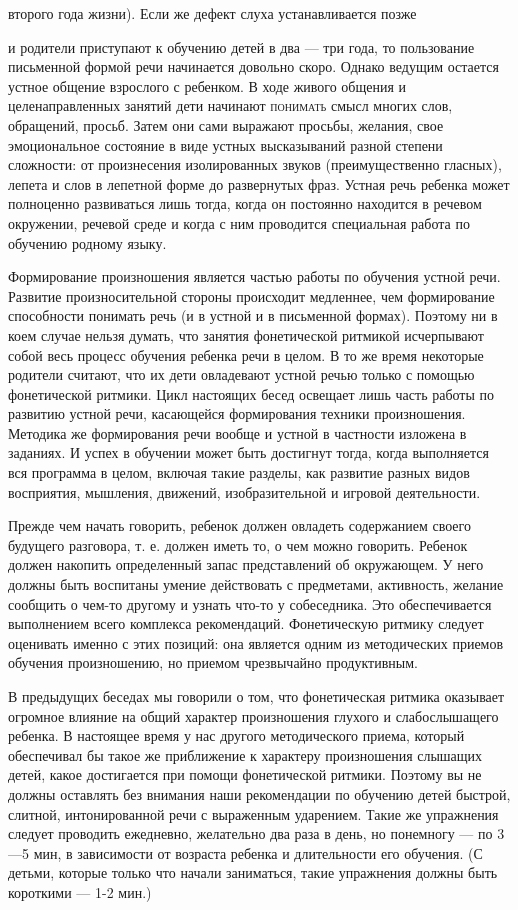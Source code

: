 \documentclass[a5paper]{book}
\begin{document}
второго года жизни). Если же дефект слуха устанавливается позже

и родители приступают к обучению детей в два --- три года, то
пользование письменной формой речи начинается довольно скоро. Однако
ведущим остается устное общение взрослого с ребенком. В ходе живого
общения и целенаправленных занятий дети начинают \textsc{понимать} смысл
многих слов, обращений, просьб. Затем они сами выражают просьбы,
желания, свое эмоциональное состояние в виде устных высказываний разной
степени сложности: от произнесения изолированных звуков (преимущественно
гласных), лепета и слов в лепетной форме до развернутых фраз. Устная
речь ребенка может полноценно развиваться лишь тогда, когда он постоянно
находится в речевом окружении, речевой среде и когда с ним проводится
специальная работа по обучению родному языку.

Формирование произношения является частью работы по обучения устной
речи. Развитие произносительной стороны происходит медленнее, чем
формирование способности понимать речь (и в устной и в письменной
формах). Поэтому ни в коем случае нельзя думать, что занятия
фонетической ритмикой исчерпывают собой весь процесс обучения ребенка
речи в целом. В то же время некоторые родители считают, что их дети
овладевают устной речью только с помощью фонетической ритмики. Цикл
настоящих бесед освещает лишь часть работы по развитию устной речи,
касающейся формирования техники произношения. Методика же формирования
речи вообще и устной в частности изложена в заданиях. И успех в обучении
может быть достигнут тогда, когда выполняется вся программа в целом,
включая такие разделы, как развитие разных видов восприятия, мышления,
движений, изобразительной и игровой деятельности.

Прежде чем начать говорить, ребенок должен овладеть содержанием своего
будущего разговора, т. е. должен иметь то, о чем можно говорить. Ребенок
должен накопить определенный запас представлений об окружающем. У него
должны быть воспитаны умение действовать с предметами, активность,
желание сообщить о чем-то другому и узнать что-то у собеседника. Это
обеспечивается выполнением всего комплекса рекомендаций. Фонетическую
ритмику следует оценивать именно с этих позиций: она является одним из
методических приемов обучения произношению, но приемом чрезвычайно
продуктивным.

В предыдущих беседах мы говорили о том, что фонетическая ритмика
оказывает огромное влияние на общий характер произношения глухого и
слабослышащего ребенка. В настоящее время у нас другого методического
приема, который обеспечивал бы такое же приближение к характеру
произношения слышащих детей, какое достигается при помощи фонетической
ритмики. Поэтому вы не должны оставлять без внимания наши рекомендации
по обучению детей быстрой, слитной, интонированной речи с выраженным
ударением. Такие же упражнения следует проводить ежедневно, желательно
два раза в день, но понемногу --- по 3---5 мин, в зависимости от
возраста ребенка и длительности его обучения. (С детьми, которые только
что начали заниматься, такие упражнения должны быть короткими --- 1-2
мин.)
\end{document}
